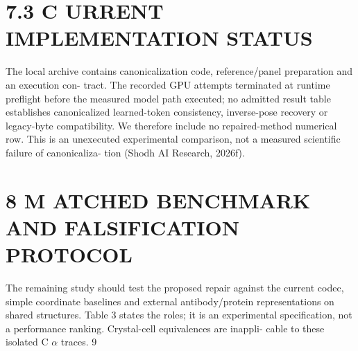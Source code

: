 \documentclass[11pt]{article}
\begin{document}
\section*{7.3 C URRENT IMPLEMENTATION STATUS}

The local archive contains canonicalization code, reference/panel preparation and an execution con-
tract. The recorded GPU attempts terminated at runtime preflight before the measured model path
executed; no admitted result table establishes canonicalized learned-token consistency, inverse-pose
recovery or legacy-byte compatibility. We therefore include no repaired-method numerical row.
This is an unexecuted experimental comparison, not a measured scientific failure of canonicaliza-
tion (Shodh AI Research, 2026f).

\section*{8 M ATCHED BENCHMARK AND FALSIFICATION PROTOCOL}

The remaining study should test the proposed repair against the current codec, simple coordinate
baselines and external antibody/protein representations on shared structures. Table 3 states the roles;
it is an experimental specification, not a performance ranking. Crystal-cell equivalences are inappli-
cable to these isolated C \ensuremath{\alpha} traces.
9
\end{document}
